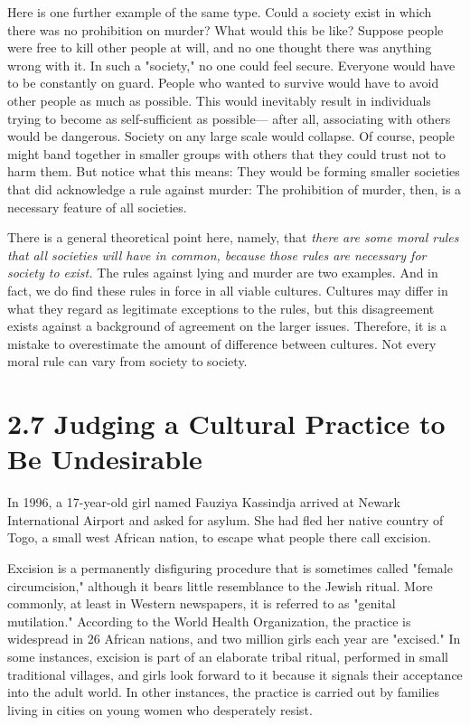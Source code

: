 Here  is  one  further  example  of  the  same  type.  Could  a  society  exist  in 
which  there  was  no  prohibition  on  murder?  What  would  this  be  like? 
Suppose people were free to kill other people at will, and no one thought 
there  was anything  wrong  with  it.  In  such a  "society,"  no  one  could feel 
secure.  Everyone  would  have  to  be  constantly  on  guard.  People  who 
wanted to survive would have to avoid other people as much as 
possible.  This  would  inevitably  result  in  individuals  trying  to  become  as 
self-sufficient  as  possible— after  all,  associating  with  others  would  be 
dangerous. Society on any large scale would collapse. Of course, people 
might  band  together  in  smaller  groups  with  others  that  they  could  trust 
not  to  harm  them.  But  notice  what  this  means:  They  would  be  forming 
smaller  societies  that  did  acknowledge  a  rule  against  murder:  The 
prohibition of murder, then, is a necessary feature of all societies. 

There  is  a  general  theoretical  point  here,  namely,  that  \emph{there  are  some 
moral  rules  that  all  societies  will  have  in  common,  because  those  rules 
are necessary for society to exist.} The rules against lying and murder are 
two  examples.  And  in  fact,  we  do  find  these  rules  in  force  in  all  viable 
cultures. Cultures may differ in what they regard as legitimate exceptions 
to  the  rules,  but  this  disagreement  exists  against  a  background  of 
agreement on the larger issues. Therefore, it is a mistake to 
overestimate the amount of difference between cultures. Not every moral 
rule can vary from society to society. 
\section{2.7 Judging a Cultural Practice to Be Undesirable} 
In  1996,  a  17-year-old  girl  named  Fauziya Kassindja  arrived  at  Newark 
International  Airport  and  asked  for  asylum.  She  had  fled  her  native 
country  of  Togo,  a  small  west  African  nation,  to  escape  what  people 
there call excision. 

Excision is a permanently disfiguring procedure that is sometimes called 
"female  circumcision," although it bears little resemblance to the Jewish 
ritual.  More  commonly,  at  least  in Western newspapers,  it is  referred  to 
as  "genital  mutilation."  According  to  the World  Health  Organization,  the 
practice  is  widespread  in  26  African  nations,  and  two  million  girls  each 
year  are  "excised."  In  some  instances,  excision  is  part  of  an  elaborate 
tribal ritual, performed in small traditional villages, and girls look forward 
to  it  because  it  signals  their  acceptance  into  the  adult  world.  In  other 
instances, the practice is carried out by families living in cities on young 
women who desperately resist. 

